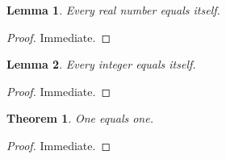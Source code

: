 \newtheorem{lemma}{Lemma}
\newtheorem{theorem}{Theorem}

\begin{lemma}\label{lem:duplicate}
Every real number equals itself.
\end{lemma}
\begin{proof}
Immediate.
\end{proof}

\begin{lemma}\label{lem:duplicate}
Every integer equals itself.
\end{lemma}
\begin{proof}
Immediate.
\end{proof}

\begin{theorem}\label{thm:duplicate-label-target}
One equals one.
\end{theorem}
\begin{proof}
Immediate.
\end{proof}
